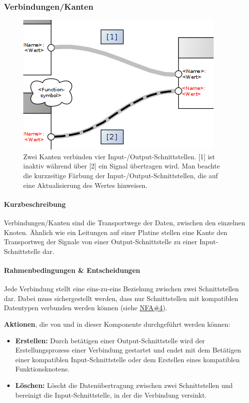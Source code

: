 
\subsubsection{Verbindungen/Kanten}
\begin{figure}[h]
  \centering
  \includegraphics[width=.6\textwidth]{bilder/chapter4/chapter4_3/links.png}
  \caption{Zwei Kanten verbinden vier Input-/Output-Schnittstellen. [1] ist inaktiv während über [2] ein Signal übertragen wird. Man beachte die kurzzeitige Färbung der Input-/Output-Schnittstellen, die auf eine Aktualisierung des Wertes hinweisen.}
  \label{fig:genericlink}
\end{figure}


\paragraph{Kurzbeschreibung} Verbindungen/Kanten sind die Transportwege der Daten, zwischen den einzelnen Knoten. Ähnlich wie ein Leitungen auf einer Platine stellen eine Kante den Transportweg der Signale von einer Output-Schnittstelle zu einer Input-Schnittstelle dar.

\paragraph{Rahmenbedingungen \& Entscheidungen} Jede Verbindung stellt eine eins-zu-eins Beziehung zwischen zwei Schnittstellen dar. Dabei muss sichergestellt werden, dass nur Schnittstellen mit kompatiblen Datentypen verbunden werden können (siehe \hyperref[tab:NFA4]{NFA\#4}). 

\textbf{Aktionen}, die von und in dieser Komponente durchgeführt werden können: 
\begin{itemize}
    \item \textbf{Erstellen:} Durch betätigen einer Output-Schnittstelle wird der Erstellungsprozess einer Verbindung gestartet und endet mit dem Betätigen einer kompatiblen Input-Schnittstelle oder dem Erstellen eines kompatiblen Funktionsknotens.
    \item \textbf{Löschen:} Löscht die Datenübertragung zwischen zwei Schnittstellen und bereinigt die Input-Schnittstelle, in der die Verbindung versinkt.
\end{itemize}

